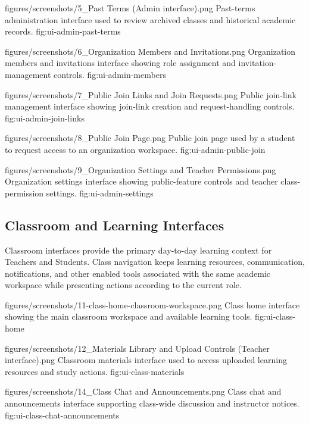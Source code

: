\EduUiFigure
  {figures/screenshots/5_Past Terms (Admin interface).png}
  {Past-terms administration interface used to review archived classes and historical academic records.}
  {fig:ui-admin-past-terms}

\EduUiFigure
  {figures/screenshots/6_Organization Members and Invitations.png}
  {Organization members and invitations interface showing role assignment and invitation-management controls.}
  {fig:ui-admin-members}

\EduUiFigure
  {figures/screenshots/7_Public Join Links and Join Requests.png}
  {Public join-link management interface showing join-link creation and request-handling controls.}
  {fig:ui-admin-join-links}

\EduUiFigure
  {figures/screenshots/8_Public Join Page.png}
  {Public join page used by a student to request access to an organization workspace.}
  {fig:ui-admin-public-join}

\EduUiFigure
  {figures/screenshots/9_Organization Settings and Teacher Permissions.png}
  {Organization settings interface showing public-feature controls and teacher class-permission settings.}
  {fig:ui-admin-settings}

\clearpage

\subsection{Classroom and Learning Interfaces}

Classroom interfaces provide the primary day-to-day learning context for
Teachers and Students. Class navigation keeps learning resources,
communication, notifications, and other enabled tools associated with the same
academic workspace while presenting actions according to the current role.

\EduUiFigure
  {figures/screenshots/11-class-home-classroom-workspace.png}
  {Class home interface showing the main classroom workspace and available learning tools.}
  {fig:ui-class-home}

\EduUiFigure
  {figures/screenshots/12_Materials Library and Upload Controls (Teacher interface).png}
  {Classroom materials interface used to access uploaded learning resources and study actions.}
  {fig:ui-class-materials}

\EduUiFigure
  {figures/screenshots/14_Class Chat and Announcements.png}
  {Class chat and announcements interface supporting class-wide discussion and instructor notices.}
  {fig:ui-class-chat-announcements}

